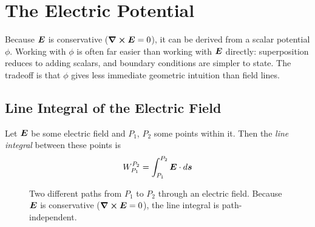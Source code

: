 \chapter{The Electric Potential}

Because $\vect{E}$ is conservative ($\curl\vect{E}=0$), it can be derived from a scalar potential $\phi$. Working with $\phi$ is often far easier than working with $\vect{E}$ directly: superposition reduces to adding scalars, and boundary conditions are simpler to state. The tradeoff is that $\phi$ gives less immediate geometric intuition than field lines.

\section{Line Integral of the Electric Field}

Let $\vect{E}$ be some electric field and $P_1$, $P_2$ some points within it. Then the \emph{line integral} between these points is
\[
  W_{P_1}^{P_2} = \int_{P_1}^{P_2} \vect{E} \cdot d\lvect{s}
\]

\begin{figure}[H]
\begin{center}
\end{center}
\caption{Two different paths from $P_1$ to $P_2$ through an electric field. Because $\vect{E}$ is conservative ($\curl\vect{E}=0$), the line integral is path-independent.}
\end{figure}

